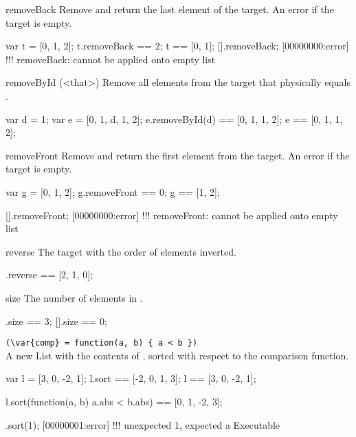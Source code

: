\begin{urbiscriptapi}
\item[removeBack]
  Remove and return the last element of the target. An error if the
  target is empty.

\begin{urbiassert}
var t = [0, 1, 2];
t.removeBack == 2;
t == [0, 1];
[].removeBack;
[00000000:error] !!! removeBack: cannot be applied onto empty list
\end{urbiassert}


\item[removeById](<that>)%
  Remove all elements from the target that physically equals
  .

\begin{urbiassert}
var d = 1;
var e = [0, 1, d, 1, 2];
e.removeById(d) == [0, 1, 1, 2];
e == [0, 1, 1, 2];
\end{urbiassert}


\item[removeFront] Remove and return the first element from the target. An
  error if the target is empty.

\begin{urbiassert}
var g = [0, 1, 2];
g.removeFront == 0;
g == [1, 2];

[].removeFront;
[00000000:error] !!! removeFront: cannot be applied onto empty list
\end{urbiassert}


\item[reverse]
  The target with the order of elements inverted.
\begin{urbiassert}
[0, 1, 2].reverse == [2, 1, 0];
\end{urbiassert}


\item[size]
  The number of elements in \this.
\begin{urbiassert}
[0, 1, 2].size == 3;
[].size == 0;
\end{urbiassert}


\item {}\lstinline|(\var{comp} = function(a, b) { a < b })|\\%
  A new List with the contents of \this, sorted with respect to the
   comparison function.
\begin{urbiassert}
var l = [3, 0, -2, 1];
l.sort == [-2, 0, 1, 3];
l      == [3, 0, -2, 1];

l.sort(function(a, b) {a.abs < b.abs})
       == [0, 1, -2, 3];
\end{urbiassert}

\begin{urbiscript}
[2, 1].sort(1);
[00000001:error] !!! unexpected 1, expected a Executable
\end{urbiscript}



\end{urbiscriptapi}
